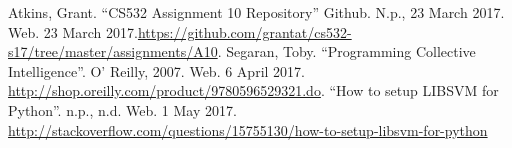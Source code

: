 \documentclass[letterpaper,11pt]{article}
\begin{document}
\clearpage


\clearpage



\begin{thebibliography}{9}
Atkins, Grant. ``CS532 Assignment 10 Repository'' Github. N.p., 23 March 2017. Web. 23 March 2017.\url{https://github.com/grantat/cs532-s17/tree/master/assignments/A10}.
Segaran, Toby. ``Programming Collective Intelligence''. O' Reilly, 2007. Web. 6 April 2017. \url{http://shop.oreilly.com/product/9780596529321.do}.
``How to setup LIBSVM for Python''. n.p., n.d. Web. 1 May 2017. \url{http://stackoverflow.com/questions/15755130/how-to-setup-libsvm-for-python}
\end{thebibliography}
\end{document}
